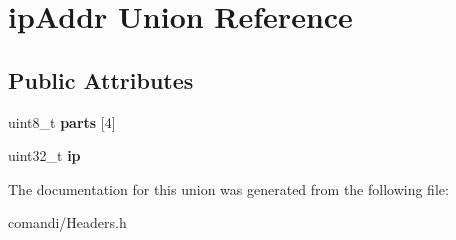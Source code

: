 \hypertarget{unionipAddr}{}\section{ip\+Addr Union Reference}
\label{unionipAddr}
\subsection*{Public Attributes}
\begin{DoxyCompactItemize}
\item 
uint8\+\_\+t {\bfseries parts} \mbox{[}4\mbox{]}\hypertarget{unionipAddr_a556df322f89f52547482d24855a13049}{}\label{unionipAddr_a556df322f89f52547482d24855a13049}

\item 
uint32\+\_\+t {\bfseries ip}\hypertarget{unionipAddr_a55faff16e5463af66104860af56d915e}{}\label{unionipAddr_a55faff16e5463af66104860af56d915e}

\end{DoxyCompactItemize}


The documentation for this union was generated from the following file\+:\begin{DoxyCompactItemize}
\item 
comandi/Headers.\+h\end{DoxyCompactItemize}
